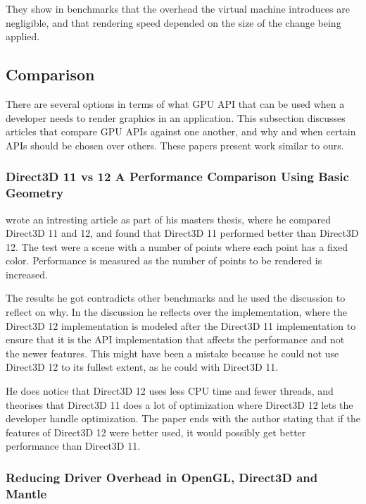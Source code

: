 They show in benchmarks that the overhead the virtual machine introduces are negligible, and that rendering speed depended on the size of the change being applied. 

\subsection{Comparison} 
There are several options in terms of what \gls{GPU} \gls{API} that can be used when a developer needs to render graphics in an application.
This subsection discusses articles that compare \gls{GPU} \glspl{API} against one another, and why and when certain \glspl{API} should be chosen over others.
These papers present work similar to ours.

\subsubsection{Direct3D 11 vs 12 A Performance Comparison Using Basic Geometry}

\citet{2016_direct3d} wrote an intresting article as part of his masters thesis, where he compared Direct3D 11 and 12, and found that Direct3D 11 performed better than Direct3D 12.
The test were a scene with a number of points where each point has a fixed color.
Performance is measured as the number of points to be rendered is increased.

The results he got contradicts other benchmarks and he used the discussion to reflect on why.
In the discussion he reflects over the implementation, where the Direct3D 12 implementation is modeled after the Direct3D 11 implementation to ensure that it is the \gls{API} implementation that affects the performance and not the newer features.
This might have been a mistake because he could not use Direct3D 12 to its fullest extent, as he could with Direct3D 11.

He does notice that Direct3D 12 uses less \gls{CPU} time and fewer threads, and theorises that Direct3D 11 does a lot of optimization where Direct3D 12 lets the developer handle optimization.
The paper ends with the author stating that if the features of Direct3D 12 were better used, it would possibly get better performance than Direct3D 11. 

\subsubsection{Reducing Driver Overhead in OpenGL, Direct3D and Mantle}

